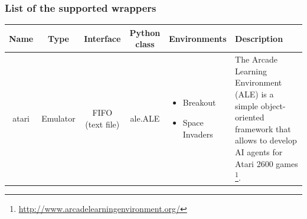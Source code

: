 \documentclass[a4paper,oneside,dvipsnames]{article}
\begin{document}
\subsubsection[List of the supported wrappers]{List of the supported wrappers}
\label{sec:wrappersList}
\begin{center}
    \begin{tabu}{ | c | c | c | c | p{2.5cm} | p{5cm} |}
    \hline
    \rowfont{\bfseries}
    \textbf{Name} & \textbf{Type} & \textbf{Interface} & \textbf{Python class} & \textbf{Environments} & \textbf{Description} \\ \hline
    \rowfont{\scriptsize}
    atari & Emulator & FIFO (text file) & ale.ALE
    & \noindent
    \begin{itemize}[noitemsep,topsep=0pt,parsep=0pt,partopsep=0pt]
        \item Breakout
        \item Space Invaders
    \end{itemize}
    & The Arcade Learning Environment (ALE) is a simple object-oriented framework that allows to develop AI agents for Atari 2600 games
    \footnote{\url{http://www.arcadelearningenvironment.org/}}. \\
    \hline
    \end{tabu}
\end{center}
\end{document}
